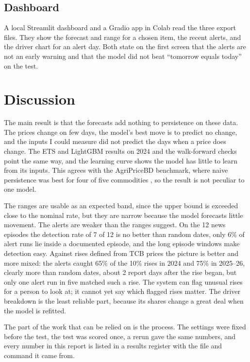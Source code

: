 \subsection{Dashboard}
A local Streamlit dashboard and a Gradio app in Colab read the three export files. They show the forecast and range for a chosen item, the recent alerts, and the driver chart for an alert day. Both state on the first screen that the alerts are not an early warning and that the model did not beat ``tomorrow equals today'' on the test.

\section{Discussion}
The main result is that the forecasts add nothing to persistence on these data. The prices change on few days, the model's best move is to predict no change, and the inputs I could measure did not predict the days when a price does change. The ETS and LightGBM results on 2024 and the walk-forward checks point the same way, and the learning curve shows the model has little to learn from its inputs. This agrees with the AgriPriceBD benchmark, where naive persistence was best for four of five commodities \cite{agripricebd}, so the result is not peculiar to one model.

The ranges are usable as an expected band, since the upper bound is exceeded close to the nominal rate, but they are narrow because the model forecasts little movement. The alerts are weaker than the ranges suggest. On the 12 news episodes the detection rate of 7 of 12 is no better than random dates, only 6\% of alert runs lie inside a documented episode, and the long episode windows make detection easy. Against rises defined from TCB prices the picture is better and more mixed: the alerts caught 65\% of the 10\% rises in 2024 and 75\% in 2025--26, clearly more than random dates, about 2 report days after the rise began, but only one alert run in five matched such a rise. The system can flag unusual rises for a person to look at; it cannot yet say which flagged rises matter. The driver breakdown is the least reliable part, because its shares change a great deal when the model is refitted.

The part of the work that can be relied on is the process. The settings were fixed before the test, the test was scored once, a rerun gave the same numbers, and every number in this report is listed in a results register with the file and command it came from.
